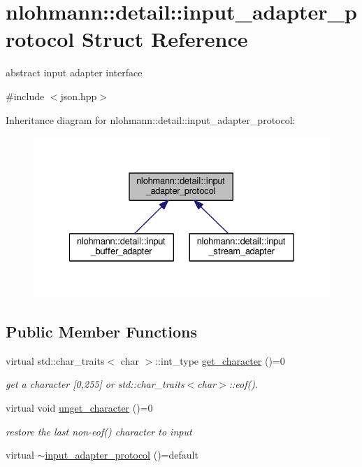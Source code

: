 \hypertarget{structnlohmann_1_1detail_1_1input__adapter__protocol}{}\section{nlohmann\+:\+:detail\+:\+:input\+\_\+adapter\+\_\+protocol Struct Reference}
\label{structnlohmann_1_1detail_1_1input__adapter__protocol}


abstract input adapter interface  




{\ttfamily \#include $<$json.\+hpp$>$}



Inheritance diagram for nlohmann\+:\+:detail\+:\+:input\+\_\+adapter\+\_\+protocol\+:\nopagebreak
\begin{figure}[H]
\begin{center}
\leavevmode
\includegraphics[width=328pt]{structnlohmann_1_1detail_1_1input__adapter__protocol__inherit__graph}
\end{center}
\end{figure}
\subsection*{Public Member Functions}
\begin{DoxyCompactItemize}
\item 
virtual std\+::char\+\_\+traits$<$ char $>$\+::int\+\_\+type \hyperlink{structnlohmann_1_1detail_1_1input__adapter__protocol_aac10a6a4048a8ce8e2ed50277692a3ca}{get\+\_\+character} ()=0
\begin{DoxyCompactList}\small\item\em get a character \mbox{[}0,255\mbox{]} or std\+::char\+\_\+traits$<$char$>$\+::eof(). \end{DoxyCompactList}\item 
virtual void \hyperlink{structnlohmann_1_1detail_1_1input__adapter__protocol_aeb5cac3e86e8df6cfe48cc42de2e9225}{unget\+\_\+character} ()=0
\begin{DoxyCompactList}\small\item\em restore the last non-\/eof() character to input \end{DoxyCompactList}\item 
virtual \hyperlink{structnlohmann_1_1detail_1_1input__adapter__protocol_a92dac74def4ac5adacd0684088bd4082}{$\sim$input\+\_\+adapter\+\_\+protocol} ()=default
\end{DoxyCompactItemize}


